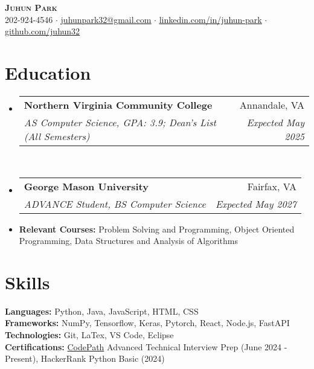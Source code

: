 \documentclass[letterpaper,11pt]{article}
\makeatletter
\newcommand{\resumeItem}[1]{
  \item\small{
    {#1 \vspace{-2pt}}
  }
}
\newcommand{\resumeSubheading}[4]{
  \vspace{-2pt}\item
    \begin{tabular*}{0.97\textwidth}[t]{l@{\extracolsep{\fill}}r@{\hspace{-0.2in}}}
        \textbf{#1} & #2 \\
        \textit{\small#3} & \textit{\small #4} \\
    \end{tabular*}\vspace{-0pt}
}
\newcommand{\resumeSubHeadingListStart}{\begin{itemize}[leftmargin=0.00in, rightmargin=-0.2in, label={}]}
\newcommand{\resumeSubHeadingListEnd}{\end{itemize}}
\makeatother
\begin{document}
\begin{center}
    \textbf{\Huge \scshape {Juhun Park}} \\ \vspace{1pt}
    \small 202-924-4546 $\cdot$ 
    \href{mailto:riann3207@gmail.com}{\underline{juhunpark32@gmail.com}} $\cdot$
    \href{https://linkedin.com/in/juhun-park}{\underline{linkedin.com/in/juhun-park}} $\cdot$
    \href{https://github.com/juhun32}{\underline{github.com/juhun32}} \\
\end{center}


\section{Education}
    \resumeSubHeadingListStart
        \resumeSubheading
            {Northern Virginia Community College}{Annandale, VA}
            {AS Computer Science, GPA: 3.9; Dean's List (All Semesters)}{Expected May 2025} \\
        \resumeSubheading
            {George Mason University}{Fairfax, VA}
            {ADVANCE Student, BS Computer Science}{Expected May 2027}
        
        \resumeItem{\textbf{Relevant Courses: }{Problem Solving and Programming, Object Oriented Programming, Data Structures and Analysis of Algorithms}}
    \resumeSubHeadingListEnd

\section{Skills}
    \vspace*{3pt}
    \begin{itemize}[leftmargin=0in, label={}]
        \small{\item{
            \textbf{Languages: }{Python, Java, JavaScript, HTML, CSS} \\
            \textbf{Frameworks: }{NumPy, Tensorflow, Keras, Pytorch, React, Node.js, FastAPI} \\
            \textbf{Technologies: }{Git, LaTex, VS Code, Eclipse} \\
            \textbf{Certifications: }{\href{https://www.codepath.org/}{CodePath} Advanced Technical Interview Prep (June 2024 - Present), HackerRank Python Basic (2024)} \\
        }}
    \end{itemize}
\end{document}
